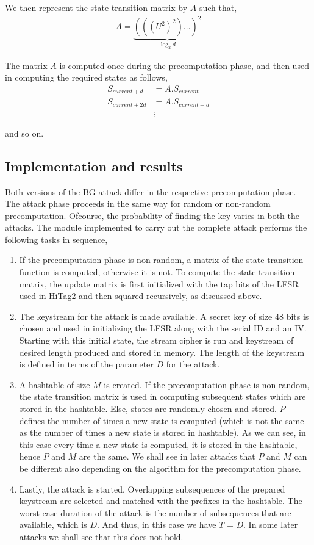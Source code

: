 We then represent the state transition matrix by $A$ such that,
\begin{align}
\label{eq:state-trans-matrix} A = \underbrace{(((U^2)^2) \dotsc )^2}_{\log_2{d}}
\end{align}

The matrix $A$ is computed once during the precomputation phase, and then used in computing the required states as follows,
\begin{align*}
S_{current + d} &= A . S_{current}\\
S_{current + 2d} &= A . S_{current + d}\\
&\vdots
\end{align*}

and so on.

\subsection{Implementation and results}

Both versions of the BG attack differ in the respective precomputation phase. The attack phase proceeds in the same way for random or non-random precomputation. Ofcourse, the probability of finding the key varies in both the attacks. The module implemented to carry out the complete attack performs the following tasks in sequence,
\begin{enumerate}
\item If the precomputation phase is non-random, a matrix of the state transition function is computed, otherwise it is not. To compute the state transition matrix, the update matrix is first initialized with the tap bits of the LFSR used in HiTag2 and then squared recursively, as discussed above.
\item The keystream for the attack is made available. A secret key of size $48$ bits is chosen and used in initializing the LFSR along with the serial ID and an IV. Starting with this initial state, the stream cipher is run and keystream of desired length produced and stored in memory. The length of the keystream is defined in terms of the parameter $D$ for the attack.
\item A hashtable of size $M$ is created. If the precomputation phase is non-random, the state transition matrix is used in computing subsequent states which are stored in the hashtable. Else, states are randomly chosen and stored. $P$ defines the number of times a new state is computed (which is not the same as the number of times a new state is stored in hashtable). As we can see, in this case every time a new state is computed, it is stored in the hashtable, hence $P$ and $M$ are the same. We shall see in later attacks that $P$ and $M$ can be different also depending on the algorithm for the precomputation phase. 
\item Lastly, the attack is started. Overlapping subsequences of the prepared keystream are selected and matched with the prefixes in the hashtable. The worst case duration of the attack is the number of subsequences that are available, which is $D$. And thus, in this case we have $T$ = $D$. In some later attacks we shall see that this does not hold. 
\end{enumerate}

